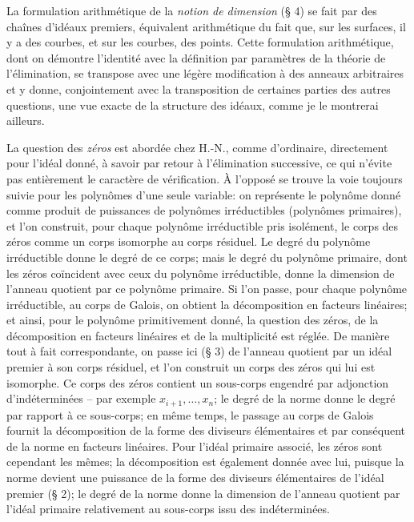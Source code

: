 La formulation arithmétique de la \emph{notion de dimension} (\S{} 4) se fait par des chaînes d'idéaux premiers, équivalent arithmétique du fait que, sur les surfaces, il y a des courbes, et sur les courbes, des points. Cette formulation arithmétique, dont on démontre l'identité avec la définition par paramètres de la théorie de l'élimination, se transpose avec une légère modification à des anneaux arbitraires et y donne, conjointement avec la transposition de certaines parties des autres questions, une vue exacte de la structure des idéaux, comme je le montrerai ailleurs.

La question des \emph{zéros} est abordée chez H.-N., comme d'ordinaire, directement pour l'idéal donné, à savoir par retour à l'élimination successive, ce qui n'évite pas entièrement le caractère de vérification. À l'opposé se trouve la voie toujours suivie pour les polynômes d'une seule variable: on représente le polynôme donné comme produit de puissances de polynômes irréductibles (polynômes primaires), et l'on construit, pour chaque polynôme irréductible pris isolément, le corps des zéros comme un corps isomorphe au corps résiduel. Le degré du polynôme irréductible donne le degré de ce corps; mais le degré du polynôme primaire, dont les zéros coïncident avec ceux du polynôme irréductible, donne la dimension de l'anneau quotient par ce polynôme primaire. Si l'on passe, pour chaque polynôme irréductible, au corps de Galois, on obtient la décomposition en facteurs linéaires; et ainsi, pour le polynôme primitivement donné, la question des zéros, de la décomposition en facteurs linéaires et de la multiplicité est réglée. De manière tout à fait correspondante, on passe ici (\S{} 3) de l'anneau quotient par un idéal premier à son corps résiduel, et l'on construit un corps des zéros qui lui est isomorphe. Ce corps des zéros contient un sous-corps engendré par adjonction d'indéterminées -- par exemple $x_{i+1},\ldots,x_n$; le degré de la norme donne le degré par rapport à ce sous-corps; en même temps, le passage au corps de Galois fournit la décomposition de la forme des diviseurs élémentaires et par conséquent de la norme en facteurs linéaires. Pour l'idéal primaire associé, les zéros sont cependant les mêmes; la décomposition est également donnée avec lui, puisque la norme devient une puissance de la forme des diviseurs élémentaires de l'idéal premier (\S{} 2); le degré de la norme donne la dimension de l'anneau quotient par l'idéal primaire relativement au sous-corps issu des indéterminées.

